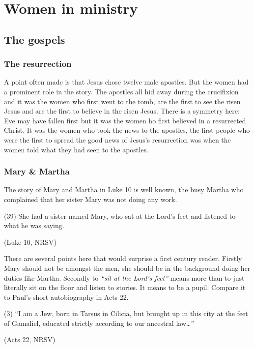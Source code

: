 \documentclass[a5paper, openany, oneside, pagesize,
headings=standardclasses, chapterprefix=false]{scrbook}
\begin{document}
\chapter{Women in ministry}

\section{The gospels}

\subsection{The resurrection}

A point often made is that Jesus chose twelve male apostles. But the
women had a prominent role in the story. The apostles all hid away
during the crucifixion and it was the women who first went to the
tomb, are the first to see the risen Jesus and are the first to
believe in the risen Jesus. There is a symmetry here: Eve may have
fallen first but it was the women ho first believed in a resurrected
Christ. It was the women who took the news to the apostles, the first
people who were the first to spread the good news of Jesus's
resurrection was when the women told what they had seen to the apostles.

\subsection{Mary \& Martha}

The story of Mary and Martha in Luke 10 is well known, the busy Martha who
complained that her sister Mary was not doing any work.  

\begin{myquote}
(39) She had a sister named Mary, who sat at the Lord’s feet and listened to what he was saying.

(Luke 10, NRSV)
\end{myquote}

There are several points here that would surprise a first century
reader. Firstly Mary should not be amongst the men, she should be in
the background doing her duties like Martha. Secondly to \emph{``sit
  at the Lord's feet''} means more than to just literally sit on the
floor and listen to stories. It means to be a pupil. Compare it to
Paul's short autobiography in Acts 22.

\begin{myquote}
(3) ``I am a Jew, born in Tarsus in Cilicia, but brought up in this
city at the feet of Gamaliel, educated strictly according to our
ancestral law\ldots''

(Acts 22, NRSV)
\end{myquote}
\end{document}
